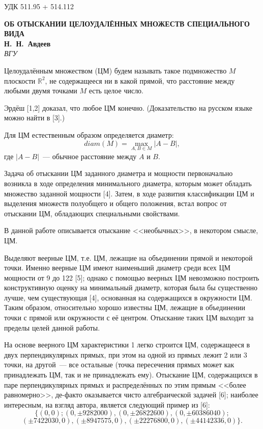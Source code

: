 \documentclass[12pt]{article}
\begin{document}
\noindent УДК 511.95 + 514.112

\begin{center}
\textbf{ОБ ОТЫСКАНИИ ЦЕЛОУДАЛЁННЫХ МНОЖЕСТВ СПЕЦИАЛЬНОГО ВИДА} \\[3mm]
\textbf{Н.~Н.~Авдеев}\\[2mm]
\emph{ВГУ}
\end{center}

Целоудалённым множеством (ЦМ) будем называть такое подмножество $M$ плоскости $\mathbb{R}^2$,
не содержащееся ни в какой прямой,
что расстояние между любыми двумя точками $M$ есть целое число.

Эрдёш [1,2] доказал, что любое ЦМ конечно.
(Доказательство на русском языке можно найти в [3].)

Для ЦМ естественным образом определяется диаметр:
$$
	diam(M) = \max_{A,B\in M} |A-B|,
$$
где $|A-B|$~--- обычное расстояние между $A$ и $B$.

Задача об отыскании ЦМ заданного диаметра и мощности первоначально возникла
в ходе определения минимального диаметра,
которым может обладать множество заданной мощности [4].
Затем, в ходе развития классификации ЦМ и выделения множеств полуобщего и общего положения,
встал вопрос от отыскании ЦМ, обладающих специальными свойствами.


В данной работе описывается отыскание <<необычных>>, в некотором смысле, ЦМ.

Выделяют веерные ЦМ, т.е. ЦМ, лежащие на объединении прямой и некоторой точки.
Именно веерные ЦМ имеют наименьший диаметр среди всех ЦМ мощности от 9 до 122 [5];
однако с помощью веерных ЦМ невозможно построить конструктивную оценку на минимальный диаметр,
которая была бы существенно лучше, чем существующая [4], основанная на содержащихся в окружности ЦМ.
Таким образом, относительно хорошо известны ЦМ, лежащие в объединении точки с прямой или окружности с её центром.
Отыскание таких ЦМ выходит за пределы целей данной работы.

На основе веерного ЦМ характеристики 1 легко строится ЦМ, содержащееся в двух перпендикулярных прямых,
при этом на одной из прямых лежит 2 или 3 точки, на другой~--- все остальные
(точка пересечения прямых может как принадлежать ЦМ, так и не принадлежать ему).
Отыскание ЦМ, содержащихся в паре перпендикулярных прямых и распределённых по этим прямым
<<более равномерно>>, де-факто оказывается чисто алгебраической задачей [6];
наиболее интересным, на взгляд автора, является следующий пример из [6]:
$$
\{
(0,0);
(0,\pm 9282000),
(0,\pm 26822600),
(0,\pm 60386040);
$$
$$
(\pm 7422030,0),
(\pm 8947575, 0),
(\pm 22276800,0),
(\pm 44142336,0)
\}
.
$$
\end{document}
